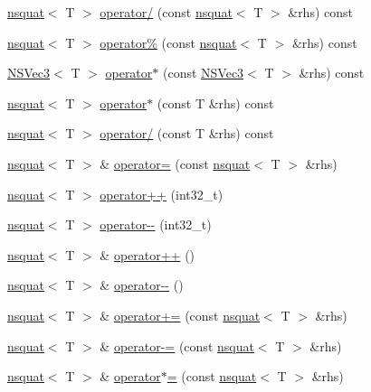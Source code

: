 \begin{DoxyCompactItemize}
\item 
\hyperlink{structnsquat}{nsquat}$<$ T $>$ \hyperlink{structnsquat_ab0148cd9b0cb29f84805eafcf820813f}{operator/} (const \hyperlink{structnsquat}{nsquat}$<$ T $>$ \&rhs) const 
\item 
\hyperlink{structnsquat}{nsquat}$<$ T $>$ \hyperlink{structnsquat_a65d33a1eaa808931c2814e3c12d7d5f8}{operator\%} (const \hyperlink{structnsquat}{nsquat}$<$ T $>$ \&rhs) const 
\item 
\hyperlink{structNSVec3}{N\-S\-Vec3}$<$ T $>$ \hyperlink{structnsquat_af155deed127c8a16bba6f7a52a12b8aa}{operator$\ast$} (const \hyperlink{structNSVec3}{N\-S\-Vec3}$<$ T $>$ \&rhs) const 
\item 
\hyperlink{structnsquat}{nsquat}$<$ T $>$ \hyperlink{structnsquat_a9231c3d0d4622389a441275b4d75c14d}{operator$\ast$} (const T \&rhs) const 
\item 
\hyperlink{structnsquat}{nsquat}$<$ T $>$ \hyperlink{structnsquat_a52e455050c0278f627ce32e5876748de}{operator/} (const T \&rhs) const 
\item 
\hyperlink{structnsquat}{nsquat}$<$ T $>$ \& \hyperlink{structnsquat_a008e3d3e51cbb27a2e6b572e34624da6}{operator=} (const \hyperlink{structnsquat}{nsquat}$<$ T $>$ \&rhs)
\item 
\hyperlink{structnsquat}{nsquat}$<$ T $>$ \hyperlink{structnsquat_a19901df0ffb8ca500efc90cbfb42189a}{operator++} (int32\-\_\-t)
\item 
\hyperlink{structnsquat}{nsquat}$<$ T $>$ \hyperlink{structnsquat_a2502835153719a3c52df34474c82841d}{operator-\/-\/} (int32\-\_\-t)
\item 
\hyperlink{structnsquat}{nsquat}$<$ T $>$ \& \hyperlink{structnsquat_a707aa5fcf1a0ddb612f17b4f00025892}{operator++} ()
\item 
\hyperlink{structnsquat}{nsquat}$<$ T $>$ \& \hyperlink{structnsquat_a6ca3fdeb707c963f42d6902aedc33b02}{operator-\/-\/} ()
\item 
\hyperlink{structnsquat}{nsquat}$<$ T $>$ \& \hyperlink{structnsquat_a901c451b2f2566abfd513147e56c2a4e}{operator+=} (const \hyperlink{structnsquat}{nsquat}$<$ T $>$ \&rhs)
\item 
\hyperlink{structnsquat}{nsquat}$<$ T $>$ \& \hyperlink{structnsquat_aec2fb6faa39578f87046209070e541a6}{operator-\/=} (const \hyperlink{structnsquat}{nsquat}$<$ T $>$ \&rhs)
\item 
\hyperlink{structnsquat}{nsquat}$<$ T $>$ \& \hyperlink{structnsquat_a9e45127c71a6380f3ddbe4e0545e828f}{operator$\ast$=} (const \hyperlink{structnsquat}{nsquat}$<$ T $>$ \&rhs)

\end{DoxyCompactItemize}
